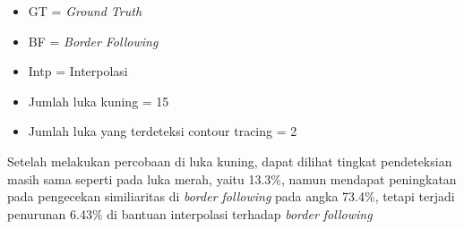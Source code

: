 \begin{itemize}
    \setlength{\itemsep}{0pt}
    \setlength{\parskip}{0pt}
    \setlength{\parsep}{0pt}
    \item GT = \textit{Ground Truth}
    \item BF = \textit{Border Following}
    \item Intp = Interpolasi
\end{itemize}
\begin{itemize}
    \setlength{\itemsep}{0pt}
    \setlength{\parskip}{0pt}
    \setlength{\parsep}{0pt}
    \item Jumlah luka kuning = 15
    \item Jumlah luka yang terdeteksi contour tracing = 2
\end{itemize}
Setelah melakukan percobaan di luka kuning, dapat dilihat 
tingkat pendeteksian masih sama seperti pada luka merah, yaitu 
13.3$\%$, namun mendapat peningkatan pada pengecekan similiaritas 
di \textit{border following} pada angka 73.4$\%$, tetapi terjadi 
penurunan 6.43$\%$ di bantuan interpolasi terhadap \textit{border following}

